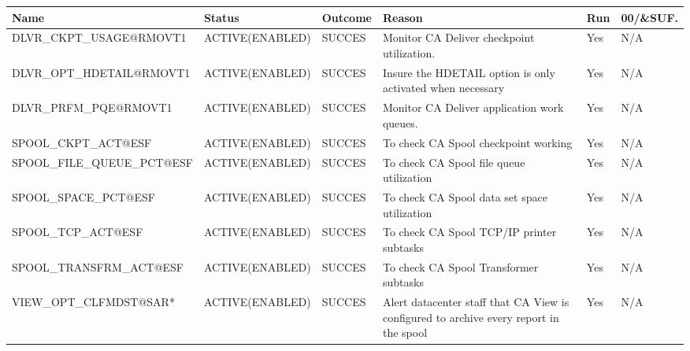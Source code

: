 \begin{landscape}
	\begin{table}[h]
		\begin{tabular}{|l|l|l|p{4.5cm}|l|l|}
			\hline
			\textbf{Name}               & \textbf{Status} & \textbf{Outcome} & \textbf{Reason}                                                                            & \textbf{Run} & \textbf{00/\&SUF.} \\ \hline
			DLVR\_CKPT\_USAGE@RMOVT1    & ACTIVE(ENABLED) & SUCCES           & Monitor   CA Deliver checkpoint utilization.                                               & Yes          & N/A                \\ \hline
			DLVR\_OPT\_HDETAIL@RMOVT1   & ACTIVE(ENABLED) & SUCCES           & Insure   the HDETAIL option is only activated when necessary                               & Yes          & N/A                \\ \hline
			DLVR\_PRFM\_PQE@RMOVT1      & ACTIVE(ENABLED) & SUCCES           & Monitor   CA Deliver application work queues.                                              & Yes          & N/A                \\ \hline
			SPOOL\_CKPT\_ACT@ESF        & ACTIVE(ENABLED) & SUCCES           & To   check CA Spool checkpoint working                                                     & Yes          & N/A                \\ \hline
			SPOOL\_FILE\_QUEUE\_PCT@ESF & ACTIVE(ENABLED) & SUCCES           & To   check CA Spool file queue utilization                                                 & Yes          & N/A                \\ \hline
			SPOOL\_SPACE\_PCT@ESF       & ACTIVE(ENABLED) & SUCCES           & To   check CA Spool data set space utilization                                             & Yes          & N/A                \\ \hline
			SPOOL\_TCP\_ACT@ESF         & ACTIVE(ENABLED) & SUCCES           & To   check CA Spool TCP/IP printer subtasks                                                & Yes          & N/A                \\ \hline
			SPOOL\_TRANSFRM\_ACT@ESF    & ACTIVE(ENABLED) & SUCCES           & To   check CA Spool Transformer subtasks                                                   & Yes          & N/A                \\ \hline
			VIEW\_OPT\_CLFMDST@SAR*     & ACTIVE(ENABLED) & SUCCES           & Alert   datacenter staff that CA View is configured to archive every report in the   spool & Yes          & N/A                \\ \hline

\end{tabular}
\end{table}
\end{landscape}
